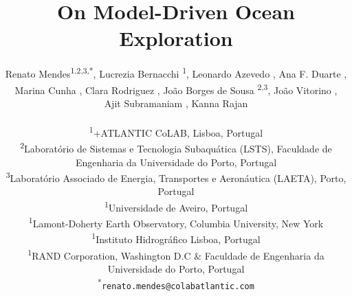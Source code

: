 \documentclass[11pt]{article}
\title{On Model-Driven Ocean Exploration}
\author{
Renato Mendes\textsuperscript{1,2,3,*},
Lucrezia Bernacchi \textsuperscript{1},
Leonardo Azevedo \textsuperscript{},
Ana F. Duarte \textsuperscript{},\\
Marina Cunha \textsuperscript{},
Clara Rodriguez \textsuperscript{},
João Borges de Sousa \textsuperscript{2,3},
João Vitorino \textsuperscript{},\\
Ajit Subramaniam \textsuperscript{},
Kanna Rajan \textsuperscript{}
\\
\\
\textsuperscript{1}{\scriptsize +ATLANTIC CoLAB, Lisboa, Portugal}\\
\textsuperscript{2}{\scriptsize Laboratório de Sistemas e Tecnologia Subaquática (LSTS), Faculdade de Engenharia da Universidade do Porto, Portugal}\\
\textsuperscript{3}{\scriptsize Laboratório Associado de Energia, Transportes e Aeronáutica (LAETA), Porto, Portugal}\\
\textsuperscript{1}{\scriptsize Universidade de Aveiro, Portugal}\\
\textsuperscript{1}{\scriptsize Lamont-Doherty Earth Observatory, Columbia University, New York}\\
\textsuperscript{1}{\scriptsize Instituto Hidrogr{\'a}fico Lisboa, Portugal}\\
\textsuperscript{1}{\scriptsize RAND Corporation, Washington D.C \& Faculdade de Engenharia da Universidade do Porto, Portugal}\\
\textsuperscript{*}\texttt{{\scriptsize renato.mendes@colabatlantic.com}}
}
\date{}
\begin{document}

\maketitle







\footnotesize{
  
}
\end{document}
